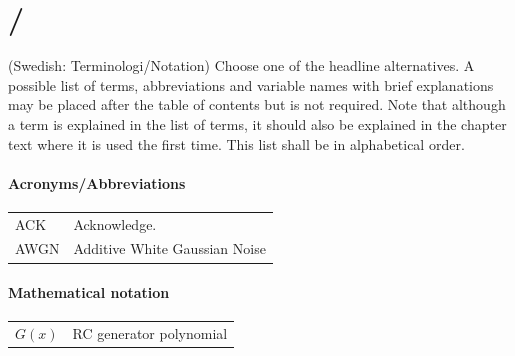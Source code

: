 \section*{/}\label{sec:terminology}
{} %
(Swedish: Terminologi/Notation) Choose one of the headline alternatives. A possible list of terms, abbreviations and variable names with brief explanations may be placed after the table of contents but is not required. Note that although a term is explained in the list of terms, it should also be explained in the chapter text where it is used the first time. This list shall be in alphabetical order.

\paragraph{Acronyms/Abbreviations}

\begin{table}[ht!]
  \begin{tabular}{l l}
  ACK & Acknowledge.\\
  AWGN & Additive White Gaussian Noise\\
  \end{tabular}
\end{table}

\paragraph{Mathematical notation}

\begin{table}[ht!]
  \begin{tabular}{l l}
  $G(x)$ & RC generator polynomial\\
  \end{tabular}
\end{table}
